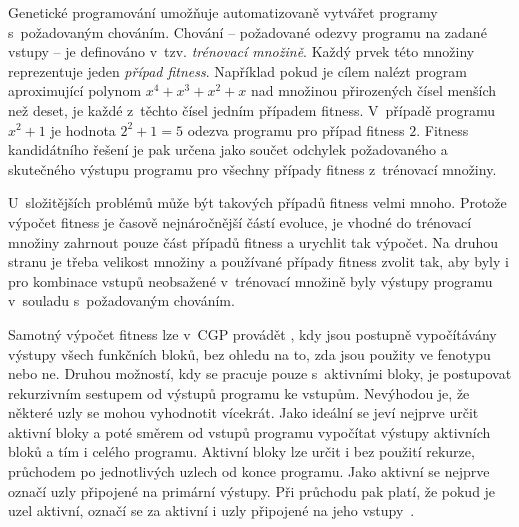 Genetické programování umožňuje automatizovaně vytvářet programy s~požadovaným chováním. Chování -- požadované odezvy programu na zadané vstupy -- je definováno v~tzv. \emph{trénovací množině}. Každý prvek této množiny reprezentuje jeden \emph{případ fitness}. Například pokud je cílem nalézt program aproximující polynom $x^4 + x^3 + x^2 +x$ nad množinou přirozených čísel menších než deset, je každé z~těchto čísel jedním případem fitness. V~případě programu $x^2 + 1$ je hodnota $2^2 + 1 = 5$ odezva programu pro případ fitness $2$. Fitness kandidátního řešení je pak určena jako součet odchylek požadovaného a skutečného výstupu programu pro všechny případy fitness z~trénovací množiny.

U~složitějších problémů může být takových případů fitness velmi mnoho. Protože výpočet fitness je časově nejnáročnější částí evoluce, je vhodné do trénovací množiny zahrnout pouze část případů fitness a urychlit tak výpočet. Na druhou stranu je třeba velikost množiny a používané případy fitness zvolit tak, aby byly i pro kombinace vstupů neobsažené v~trénovací množině byly výstupy programu v~souladu s~požadovaným chováním.






Samotný výpočet fitness lze v~CGP provádět , kdy jsou postupně vypočítávány výstupy všech funkčních bloků, bez ohledu na to, zda jsou použity ve fenotypu nebo ne. Druhou možností, kdy se pracuje pouze s~aktivními bloky, je postupovat rekurzivním sestupem od výstupů programu ke vstupům. Nevýhodou je, že některé uzly se mohou vyhodnotit vícekrát. Jako ideální se jeví nejprve určit aktivní bloky a poté směrem od vstupů programu vypočítat výstupy aktivních bloků a tím i celého programu. Aktivní bloky lze určit i bez použití rekurze, průchodem po jednotlivých uzlech od konce programu. Jako aktivní se nejprve označí uzly připojené na primární výstupy. Při průchodu pak platí, že pokud je uzel aktivní, označí se za aktivní i uzly připojené na jeho vstupy~\cite{Modra, HandbookGP}.

